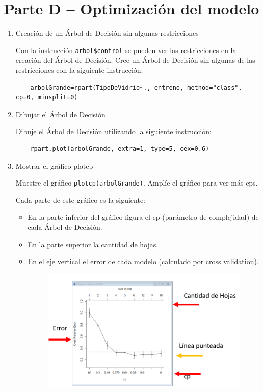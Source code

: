 \section*{Parte D – Optimización del modelo}

\begin{enumerate}
    \item Creación de un Árbol de Decisión sin algunas restricciones
    
    Con la instrucción \texttt{arbol\$control} se pueden ver las restricciones en la creación del Árbol de Decisión. Cree un Árbol de Decisión sin algunas de las restricciones con la siguiente instrucción:
    
    \begin{verbatim}
    arbolGrande=rpart(TipoDeVidrio~., entreno, method="class", cp=0, minsplit=0)
    \end{verbatim}
    
    \item Dibujar el Árbol de Decisión
    
    Dibuje el Árbol de Decisión utilizando la siguiente instrucción:
    
    \begin{verbatim}
    rpart.plot(arbolGrande, extra=1, type=5, cex=0.6)
    \end{verbatim}
    
    \item Mostrar el gráfico plotcp
    
    Muestre el gráfico \texttt{plotcp(arbolGrande)}. Amplíe el gráfico para ver más cps.
    
    Cada parte de este gráfico es la siguiente:
    
    \begin{itemize}
        \item En la parte inferior del gráfico figura el cp (parámetro de complejidad) de cada Árbol de Decisión.
        \item En la parte superior la cantidad de hojas.
        \item En el eje vertical el error de cada modelo (calculado por cross validation).
        \begin{figure}[H]
	\centering
	\includegraphics[width=\linewidth]{../Ejercicio-2/ImagenesEjercicio2/consigna.png}
	\end{figure}
    \end{itemize}
\end{enumerate}
